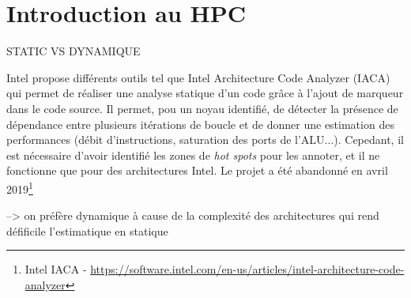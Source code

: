 \section{Introduction au HPC}\label{sec:hpc}








STATIC VS DYNAMIQUE

Intel propose différents outils tel que Intel Architecture Code Analyzer (IACA) \cite{Hirsh2012} qui permet de réaliser une analyse statique d'un code grâce à l'ajout de marqueur dans le code source. Il permet, pou un noyau identifié, de détecter la présence de dépendance entre plusieurs itérations de boucle et de donner une estimation des performances (débit d'instructions, saturation des ports de l'ALU...). Cepedant, il est nécessaire d'avoir identifié les zones de \textit{hot spots} pour les annoter, et il ne fonctionne que pour des architectures Intel. Le projet a été abandonné en avril 2019\footnote{Intel IACA - \url{https://software.intel.com/en-us/articles/intel-architecture-code-analyzer}}

--> on préfère dynamique à cause de la complexité des architectures qui rend défificile l'estimatique en statique
